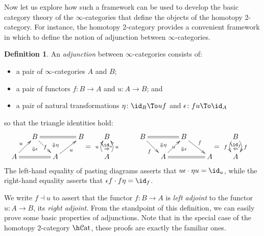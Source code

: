 \documentclass[12pt,reqno]{amsart}
\theoremstyle{plain}
\theoremstyle{definition}
\newtheorem{defn}[thm]{Definition}
\theoremstyle{remark}
\numberwithin{equation}{subsection}
\renewcommand{\Cat}{\mathcal{C}\mathrm{at}}
\begin{document}
Now let us explore how such a framework can be used to develop the basic category theory of the $\infty$-categories that define the objects of the homotopy 2-category. For instance, the homotopy 2-category provides a convenient framework in which to define the notion of adjunction between $\infty$-categories.

\begin{defn}\label{defn:adjunction} An \emph{adjunction} between $\infty$-categories consists of:
\begin{itemize}
\item a pair of $\infty$-categories $A$ and $B$;
\item a pair of functors $f \colon B \to A$ and $u \colon A \to B$; and
\item a pair of natural transformations $\eta \colon \id_B \To uf$ and $\epsilon \colon fu \To \id_A$
\end{itemize}
so that the triangle identities hold:
\[\xymatrix@=1.5em{ & B \ar[dr]|f \ar@{}[d]|(.6){\Downarrow\epsilon} \ar@{=}[rr] &  \ar@{}[d]|(.4){\Downarrow\eta} & B \ar@{}[d]^*+{=} & B &&   B \ar@{=}[rr] \ar[dr]_f & \ar@{}[d]|(.4){\Downarrow \eta} & B \ar[dr]^f \ar@{}[d]|(.6){\Downarrow\epsilon} & {\mkern40mu}\ar@{}[d]^*+{=} &  B \ar@/^2ex/[d]^f \ar@/_2ex/[d]_f \ar@{}[d]|(.4){\id_f}|(.6){\Leftarrow} & \\A \ar[ur]^u \ar@{=}[rr] & &  A \ar[ur]_u & {\mkern40mu} & A \ar@/^2ex/[u]^u \ar@/_2ex/[u]_u \ar@{}[u]|(.4){\Rightarrow}|(.6){\id_u}  && &A \ar[ur]|u \ar@{=}[rr] & & A & A }\] The left-hand equality of pasting diagrams asserts that $u\epsilon \cdot \eta u = \id_u$, while the right-hand equality asserts that $\epsilon f \cdot f\eta = \id_f$.
\end{defn}

We write $f \dashv u$ to assert that the functor $f \colon B \to A$ is \emph{left adjoint} to the functor $u \colon A \to B$, its \emph{right adjoint}. From the standpoint of this definition, we can easily prove some basic properties of adjunctions. Note that in the special case of the homotopy 2-category $\h\Cat$, these proofs are exactly the familiar ones.
\end{document}
